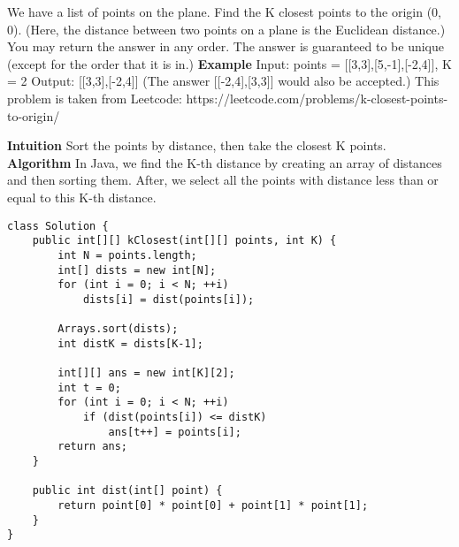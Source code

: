 \question We have a list of points on the plane.  Find the K closest points to the origin (0, 0). (Here, the distance between two points on a plane is the Euclidean distance.)\newline\newline
You may return the answer in any order.  The answer is guaranteed to be unique (except for the order that it is in.)\newline\newline 
\textbf{Example}\newline 
Input: points = [[3,3],[5,-1],[-2,4]], K = 2\newline
Output: [[3,3],[-2,4]]\newline
(The answer [[-2,4],[3,3]] would also be accepted.)\newline\newline 
This problem is taken from Leetcode: https://leetcode.com/problems/k-closest-points-to-origin/

\begin{solution}[1in]
\textbf{Intuition}\newline
Sort the points by distance, then take the closest K points.\newline\newline
\textbf{Algorithm}\newline
In Java, we find the K-th distance by creating an array of distances and then sorting them. After, we select all the points with distance less than or equal to this K-th distance.\newline\newline 
\begin{lstlisting}
class Solution {
    public int[][] kClosest(int[][] points, int K) {
        int N = points.length;
        int[] dists = new int[N];
        for (int i = 0; i < N; ++i)
            dists[i] = dist(points[i]);

        Arrays.sort(dists);
        int distK = dists[K-1];

        int[][] ans = new int[K][2];
        int t = 0;
        for (int i = 0; i < N; ++i)
            if (dist(points[i]) <= distK)
                ans[t++] = points[i];
        return ans;
    }

    public int dist(int[] point) {
        return point[0] * point[0] + point[1] * point[1];
    }
}
\end{lstlisting}
\end{solution}